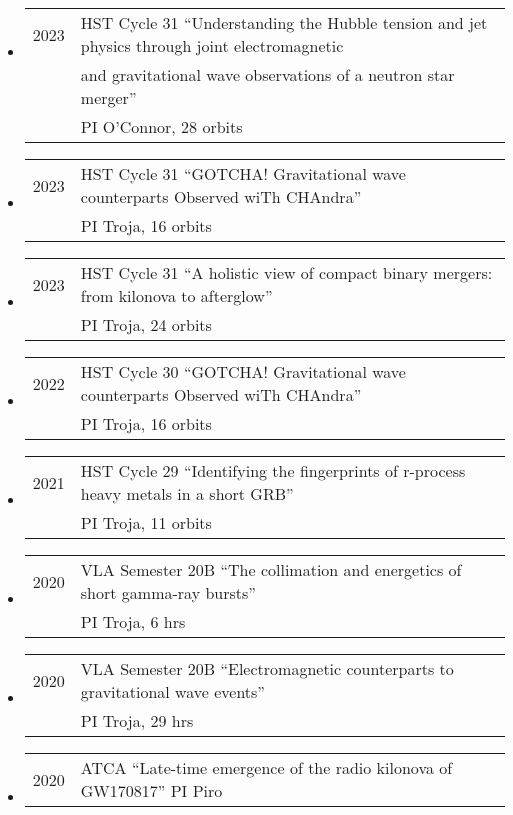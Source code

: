 \begin{itemize}
\item \begin{tabular}{ll}
2023	& HST Cycle 31 ``Understanding the Hubble tension and jet physics through joint electromagnetic\\
&  and gravitational wave observations of a neutron star merger''\\
	&  PI O'Connor, 28 orbits
\end{tabular}
\item \begin{tabular}{ll}
2023	& HST Cycle 31 ``GOTCHA! Gravitational wave counterparts Observed wiTh CHAndra''\\
	&  PI Troja, 16 orbits
\end{tabular}
\item \begin{tabular}{ll}
2023	& HST Cycle 31 ``A holistic view of compact binary mergers: from kilonova to afterglow''\\
	&  PI Troja, 24 orbits
\end{tabular}
\item \begin{tabular}{ll}
2022	& HST Cycle 30 ``GOTCHA! Gravitational wave counterparts Observed wiTh CHAndra''\\
	&  PI Troja, 16 orbits
\end{tabular}
\item \begin{tabular}{ll}
2021	& HST Cycle 29 ``Identifying the fingerprints of r-process heavy metals in a short GRB''\\
	&  PI Troja, 11 orbits
\end{tabular}
\item \begin{tabular}{ll}
2020	& VLA Semester 20B ``The collimation and energetics of short gamma-ray bursts''\\
	&  PI Troja, 6 hrs
\end{tabular}
\item \begin{tabular}{ll}
2020	& VLA Semester 20B ``Electromagnetic counterparts to gravitational wave events''\\
	&  PI Troja, 29 hrs
\end{tabular}
\item \begin{tabular}{ll}
2020	& ATCA ``Late-time emergence of the radio kilonova of GW170817'' PI Piro
\end{tabular}

\end{itemize}
